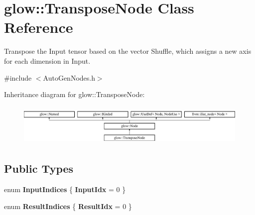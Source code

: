\hypertarget{classglow_1_1_transpose_node}{}\section{glow\+:\+:Transpose\+Node Class Reference}
\label{classglow_1_1_transpose_node}


Transpose the Input tensor based on the vector Shuffle, which assigns a new axis for each dimension in Input.  




{\ttfamily \#include $<$Auto\+Gen\+Nodes.\+h$>$}

Inheritance diagram for glow\+:\+:Transpose\+Node\+:\begin{figure}[H]
\begin{center}
\leavevmode
\includegraphics[height=2.028986cm]{classglow_1_1_transpose_node}
\end{center}
\end{figure}
\subsection*{Public Types}
\begin{DoxyCompactItemize}
\item 
\mbox{\label{classglow_1_1_transpose_node_a9d7b0f0f0bf4de1b484f28ace4046ba0}} 
enum {\bfseries Input\+Indices} \{ {\bfseries Input\+Idx} = 0
 \}
\item 
\mbox{\label{classglow_1_1_transpose_node_a7d0297fe55b8a568a4933e3414e70b86}} 
enum {\bfseries Result\+Indices} \{ {\bfseries Result\+Idx} = 0
 \}
\end{DoxyCompactItemize}
